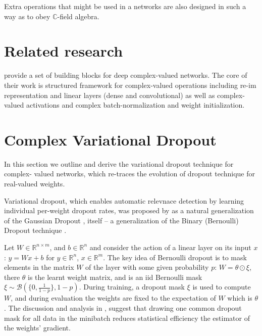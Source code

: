 \documentclass[a4paper,10pt]{article}
\newcommand{\real}{\mathbb{R}}
\newcommand{\cplx}{\mathbb{C}}
\begin{document}
Extra operations that might be used in a networks are also designed in such a way
as to obey $\cplx$-field algebra.


\section{Related research} %
\label{sec:realted_research}

\cite{trabelsi_deep_2017} provide a set of building blocks for deep complex-valued
networks. The core of their work is structured framework for complex-valued operations
including re-im representation and linear layers (dense and convolutional) as well
as complex-valued activations and complex batch-normalization and weight initialization.


\section{Complex Variational Dropout} %
\label{sec:complex_varaitional_dropout}

In this section we outline and derive the variational dropout technique for complex-%
valued networks, which re-traces the evolution of dropout technique for real-valued
weights.

Variational dropout, which enables automatic relevnace detection by learning individual
per-weight dropout rates, was proposed by \cite{kingma_variational_2015} as a natural
generalization of the Gaussian Dropout \cite{srivastava_dropout_2014,wang_fast_2013},
itself -- a generalization of the Binary (Bernoulli) Dropout technique \cite{hinton_improving_2012}.

Let $W \in\real^{n\times m}$, and $b\in \real^n$ and consider the action of a linear
layer on its input $x$: $y = W x + b$ for $y\in \real^n$, $x\in \real^m$. The key idea
of Bernoulli dropout is to mask elements in the matrix $W$ of the layer with some given
probability $p$: $W = \theta \odot \xi$, there $\theta$ is the learnt weight matrix,
and is an iid Bernoulli mask $\xi \sim \mathcal{B}(\{0, \tfrac1{1-p}\}, 1-p)$. During
training, a dropout mask $\xi$ is used to compute $W$, and during evaluation the weights
are fixed to the expectation of $W$ which is $\theta$. The discussion and analysis in
\cite{kingma_variational_2015}, suggest that drawing one common dropout mask for all
data in the minibatch reduces statistical efficiency the estimator of the weights'
gradient.
\end{document}
